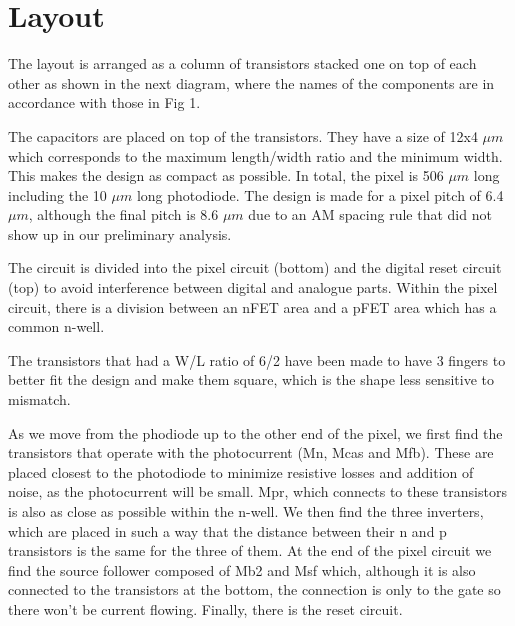 \section{Layout}

The layout is arranged as a column of transistors stacked one on top of each other as shown in the next diagram, where the names of the components are in accordance with those in Fig 1. 

The capacitors are placed on top of the transistors. They have a size of 12x4 $\mu m$ which corresponds to the maximum length/width ratio and the minimum width. This makes the design as compact as possible. In total, the pixel is 506 $\mu m$ long including the 10 $\mu m$ long photodiode. The design is made for a pixel pitch of 6.4 $\mu m$, although the final pitch is 8.6 $\mu m$ due to an AM spacing rule that did not show up in our preliminary analysis. 

The circuit is divided into the pixel circuit (bottom) and the digital reset circuit (top) to avoid interference between digital and analogue parts. Within the pixel circuit, there is a division between an nFET area and a pFET area which has a common n-well.

The transistors that had a W/L ratio of 6/2 have been made to have 3 fingers to better fit the design and make them square, which is the shape less sensitive to mismatch. 

As we move from the phodiode up to the other end of the pixel, we first find the transistors that operate with the photocurrent (Mn, Mcas and Mfb). These are placed closest to the photodiode to minimize resistive losses and addition of noise, as the photocurrent will be small. Mpr, which connects to these transistors is also as close as possible within the n-well. 
We then find the three inverters, which are placed in such a way that the distance between their n and p transistors is the same for the three of them. At the end of the pixel circuit we find the source follower composed of Mb2 and Msf which, although it is also connected to the transistors at the bottom, the connection is only to the gate so there won't be current flowing. 
Finally, there is the reset circuit. 

